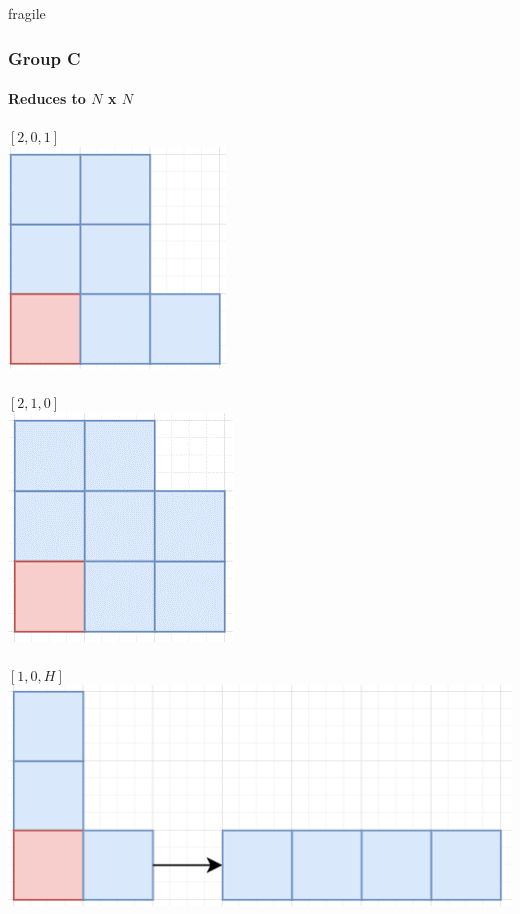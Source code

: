 \documentclass[aspectratio=169,usenames,dvipsnames]{beamer}
\begin{document}
\begin{frame}{fragile}
    \frametitle{Group C}
    \framesubtitle{Reduces to $N$ x $N$}
    
    \begin{multicols}{2}
    $[2, 0, 1]$\\
    \includegraphics[scale=.4]{[2, 0, 1].png}\\
    $  $\\
    $[2, 1, 0]$\\
    \includegraphics[scale=.4]{[2, 1, 0].png}\\
    $  $\\
    $[1, 0, H]$\\
    \includegraphics[scale=.4]{[1, 0, H].png}\\
    $  $\\
    $  $\\
    $  $\\
    \end{multicols}
\end{frame}
\end{document}
